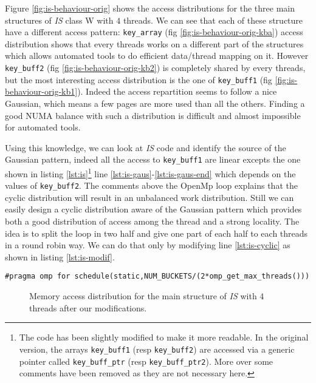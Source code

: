 Figure \ref{fig:is-behaviour-orig} shows the access distributions for the
three main structures of \emph{IS} class W with $4$ threads. We can see that
each of these structure have a different access pattern: \texttt{key\_array}
(fig \ref{fig:is-behaviour-orig-kba}) access distribution shows that every
threads works on a different part of the structures which allows automated
tools to do efficient data/thread mapping on it. However \texttt{key\_buff2}
(fig \ref{fig:is-behaviour-orig-kb2}) is completely shared by every threads,
but the most interesting access distribution is the one of \texttt{key\_buff1}
(fig \ref{fig:is-behaviour-orig-kb1}). Indeed the access repartition seems to
follow a nice Gaussian, which means a few pages are more used than all the
others. Finding a good NUMA balance with such a distribution is difficult and
almost impossible for automated tools.




Using this knowledge, we can look at \emph{IS} code and identify the source of the
Gaussian pattern, indeed all the access to \texttt{key\_buff1} are linear
excepts the one shown in listing \ref{lst:is}\footnote{
    The code has been slightly modified to make it more readable. In the
    original version, the arrays \texttt{key\_buff1} (resp \texttt{key\_buff2})
    are accessed via a generic pointer called \texttt{key\_buff\_ptr} (resp
    \texttt{key\_buff\_ptr2}). More over some comments have been removed as
    they are not necessary here.
}  line \ref{lst:is-gaus}-\ref{lst:is-gaus-end} which depends on the values of
\texttt{key\_buff2}. The comments above the OpenMp loop explains that the
cyclic distribution will result in an unbalanced work distribution. Still we can easily design a cyclic
distribution aware of the Gaussian pattern which provides both a good
distribution of access among the thread and a strong locality. The idea is to
split the loop in two half and give one part of each half to each threads in a
round robin way. We can do that only by modifying line \ref{lst:is-cyclic} as
shown in listing \ref{lst:is-modif}.
\begin{lstlisting}[caption=One line optimization for \emph{IS}, label=lst:is-modif]
#pragma omp for schedule(static,NUM_BUCKETS/(2*omp_get_max_threads()))
\end{lstlisting}

\begin{figure}[htb]
    \centering


    \caption{Memory access distribution for the main structure of
        \emph{IS} with $4$ threads after our modifications.}
    \label{fig:is-behaviour-modif}
\end{figure}

